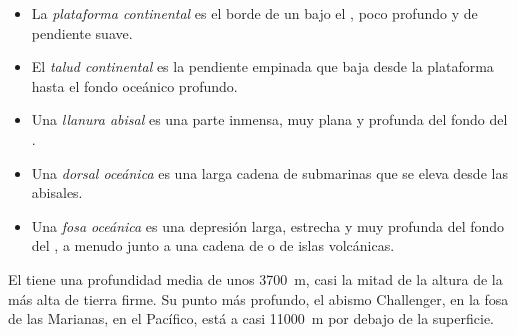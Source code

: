 \begin{definition}\label{def:g8:the-oceans:seafloor}
\begin{itemize}
  \item La \emph{plataforma continental} es
        el borde de un  bajo el , poco profundo y de pendiente
        suave.
  \item El \emph{talud continental} es la
        pendiente empinada que baja desde la plataforma hasta el fondo
        oceánico profundo.
  \item Una \emph{llanura abisal} es una parte
        inmensa, muy plana y profunda del fondo del .
  \item Una \emph{dorsal oceánica}
        es una larga cadena de  submarinas que se eleva desde las
         abisales.
  \item Una \emph{fosa oceánica} es una
        depresión larga, estrecha y muy profunda del fondo del , a
        menudo junto a una cadena de  o de islas volcánicas.
\end{itemize}
\end{definition}

El  tiene una profundidad media de unos \qty{3700}{m}, casi la mitad
de la altura de la  más alta de tierra firme. Su punto más profundo,
el abismo Challenger, en la fosa de las Marianas, en el  Pacífico,
está a casi \qty{11000}{m} por debajo de la superficie.


